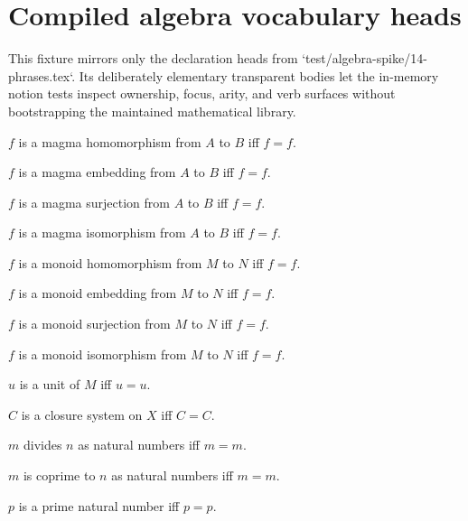 \section{Compiled algebra vocabulary heads}

This fixture mirrors only the declaration heads from
`test/algebra-spike/14-phrases.tex`.  Its deliberately elementary transparent
bodies let the in-memory notion tests inspect ownership, focus, arity, and verb
surfaces without bootstrapping the maintained mathematical library.

\begin{definition}\label{spike_phrase_magma_hom}
    $f$ is a magma homomorphism from $A$ to $B$ iff $f=f$.
\end{definition}
\begin{definition}\label{spike_phrase_magma_embedding}
    $f$ is a magma embedding from $A$ to $B$ iff $f=f$.
\end{definition}
\begin{definition}\label{spike_phrase_magma_surjection}
    $f$ is a magma surjection from $A$ to $B$ iff $f=f$.
\end{definition}
\begin{definition}\label{spike_phrase_magma_isomorphism}
    $f$ is a magma isomorphism from $A$ to $B$ iff $f=f$.
\end{definition}

\begin{definition}\label{spike_phrase_monoid_hom}
    $f$ is a monoid homomorphism from $M$ to $N$ iff $f=f$.
\end{definition}
\begin{definition}\label{spike_phrase_monoid_embedding}
    $f$ is a monoid embedding from $M$ to $N$ iff $f=f$.
\end{definition}
\begin{definition}\label{spike_phrase_monoid_surjection}
    $f$ is a monoid surjection from $M$ to $N$ iff $f=f$.
\end{definition}
\begin{definition}\label{spike_phrase_monoid_isomorphism}
    $f$ is a monoid isomorphism from $M$ to $N$ iff $f=f$.
\end{definition}
\begin{definition}\label{spike_phrase_monoid_unit}
    $u$ is a unit of $M$ iff $u=u$.
\end{definition}

\begin{definition}\label{spike_phrase_closure_system}
    $C$ is a closure system on $X$ iff $C=C$.
\end{definition}
\begin{definition}\label{spike_phrase_natural_divisibility}
    $m$ divides $n$ as natural numbers iff $m=m$.
\end{definition}
\begin{definition}\label{spike_phrase_coprime_naturals}
    $m$ is coprime to $n$ as natural numbers iff $m=m$.
\end{definition}
\begin{definition}\label{spike_phrase_prime_natural}
    $p$ is a prime natural number iff $p=p$.
\end{definition}

